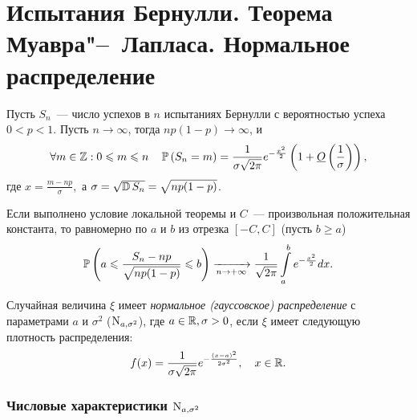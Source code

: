 \section{Испытания Бернулли. Теорема Муавра"--~Лапласа. Нормальное распределение}

\begin{namedthm} 
    Пусть $S_n$~--- число успехов в $n$ испытаниях Бернулли с вероятностью успеха $0 < p < 1$. 
    Пусть $n \to \infty$, тогда $n p(1-p) {\longrightarrow} \infty$, и 
    \begin{equation*}
        \forall m \in \mathbb{Z}: 0 \leqslant m \leqslant n \quad \operatorname{\mathbb{P}}\left(S_{n}=m\right)=\frac{1}{\sigma \sqrt{2 \pi} } e^{-\frac{x^{2}}{2}}\left(1+\underline{O}\left(\frac{1}{\sigma}\right)\right),
    \end{equation*}
    где $x = \frac{m - np}{\sigma},$ а $\sigma=\sqrt{\operatorname{\mathbb{D}} S_{n}}=\sqrt{n p(1-p)}$.
\end{namedthm}  

\begin{namedthm}
Если выполнено условие локальной теоремы и $C$~--- произвольная положительная константа, то равномерно по $a$ и $b$ из отрезка $[-C,C]$ (пусть $b \geqslant a$)
\begin{equation*}
    \operatorname{\mathbb{P}}\left(a \leqslant \frac{S_{n}-n p}{\sqrt{n p(1-p)}} \leqslant b\right) \xrightarrow[n \to +\infty]{} \frac{1}{\sqrt{2 \pi}} \int\limits_{a}^{b} e^{-\frac{x^{2}}{2}} dx.
\end{equation*}
\end{namedthm} 

\begin{defn}
    Случайная величина $\xi$ имеет \textit{нормальное (гауссовское) распределение} с параметрами $a$ и $\sigma^2$ ($\operatorname{\mathrm{N}}_{a, \sigma^2}$), где $a \in \mathbb{R}, \sigma > 0$, если $\xi$ имеет следующую плотность распределения: 
\begin{equation*}
    f(x)=\frac{1}{\sigma \sqrt{2 \pi}} e^{-\frac{(x-a)^{2}}{2 \sigma^{2}}}, \quad x \in \mathbb{R}.
\end{equation*}
\end{defn}

\subsubsection{Числовые характеристики $\operatorname{\mathrm{N}}_{a, \sigma^2}$}

